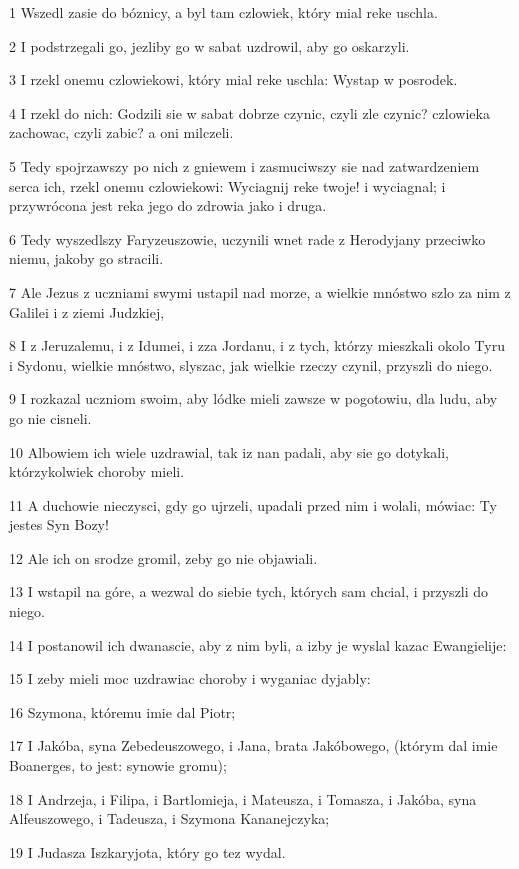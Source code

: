 \par 1 Wszedl zasie do bóznicy, a byl tam czlowiek, który mial reke uschla.
\par 2 I podstrzegali go, jezliby go w sabat uzdrowil, aby go oskarzyli.
\par 3 I rzekl onemu czlowiekowi, który mial reke uschla: Wystap w posrodek.
\par 4 I rzekl do nich: Godzili sie w sabat dobrze czynic, czyli zle czynic? czlowieka zachowac, czyli zabic? a oni milczeli.
\par 5 Tedy spojrzawszy po nich z gniewem i zasmuciwszy sie nad zatwardzeniem serca ich, rzekl onemu czlowiekowi: Wyciagnij reke twoje! i wyciagnal; i przywrócona jest reka jego do zdrowia jako i druga.
\par 6 Tedy wyszedlszy Faryzeuszowie, uczynili wnet rade z Herodyjany przeciwko niemu, jakoby go stracili.
\par 7 Ale Jezus z uczniami swymi ustapil nad morze, a wielkie mnóstwo szlo za nim z Galilei i z ziemi Judzkiej,
\par 8 I z Jeruzalemu, i z Idumei, i zza Jordanu, i z tych, którzy mieszkali okolo Tyru i Sydonu, wielkie mnóstwo, slyszac, jak wielkie rzeczy czynil, przyszli do niego.
\par 9 I rozkazal uczniom swoim, aby lódke mieli zawsze w pogotowiu, dla ludu, aby go nie cisneli.
\par 10 Albowiem ich wiele uzdrawial, tak iz nan padali, aby sie go dotykali, którzykolwiek choroby mieli.
\par 11 A duchowie nieczysci, gdy go ujrzeli, upadali przed nim i wolali, mówiac: Ty jestes Syn Bozy!
\par 12 Ale ich on srodze gromil, zeby go nie objawiali.
\par 13 I wstapil na góre, a wezwal do siebie tych, których sam chcial, i przyszli do niego.
\par 14 I postanowil ich dwanascie, aby z nim byli, a izby je wyslal kazac Ewangielije:
\par 15 I zeby mieli moc uzdrawiac choroby i wyganiac dyjably:
\par 16 Szymona, któremu imie dal Piotr;
\par 17 I Jakóba, syna Zebedeuszowego, i Jana, brata Jakóbowego, (którym dal imie Boanerges, to jest: synowie gromu);
\par 18 I Andrzeja, i Filipa, i Bartlomieja, i Mateusza, i Tomasza, i Jakóba, syna Alfeuszowego, i Tadeusza, i Szymona Kananejczyka;
\par 19 I Judasza Iszkaryjota, który go tez wydal.
